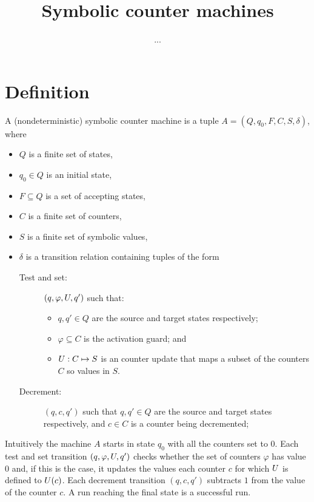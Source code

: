 \documentclass[letterpaper,11pt]{article}
\begin{document}
\title{Symbolic counter machines}

\author{...}
\maketitle

\section{Definition}

\begin{definition}
A (nondeterministic) symbolic counter machine is a tuple $A=(Q,q_0,F,C,S,\delta)$, 
where
\begin{itemize}
\item $Q$ is a finite set of states,
\item $q_0\in Q$ is an initial state,
\item $F\subseteq Q$ is a set of accepting states,
\item $C$ is a finite set of counters,
\item $S$ is a finite set of symbolic values,
\item $\delta$ is a transition relation containing tuples of the form
\begin{description}
\item[Test and set:] $(q,\varphi,U,q')$ such that:
\begin{itemize}
\item $q,q'\in Q$ are the source and target states respectively;
\item $\varphi\subseteq C$ is the activation guard; and
\item $U: C \mapsto S$ is an counter update that maps a subset of the counters $C$ so values in $S$.
\end{itemize}

\item[Decrement:] $(q,c,q')$ such that $q,q'\in Q$ are the source and target states respectively, and $c\in C$ is a counter being decremented;
    
\end{description}
\end{itemize}
\end{definition}


Intuitively the machine $A$ starts in state $q_0$ with all the counters set to $0$. 
Each test and set transition $(q,\varphi,U,q')$ checks whether the set of counters
$\varphi$ has value $0$ and, if this is the case, it updates the values each
counter $c$ for which $U$ is defined to $U(c)$.
Each decrement transition $(q,c,q')$ subtracts $1$ from the value of the counter $c$.
A run reaching the final state is a successful run.
\end{document}
